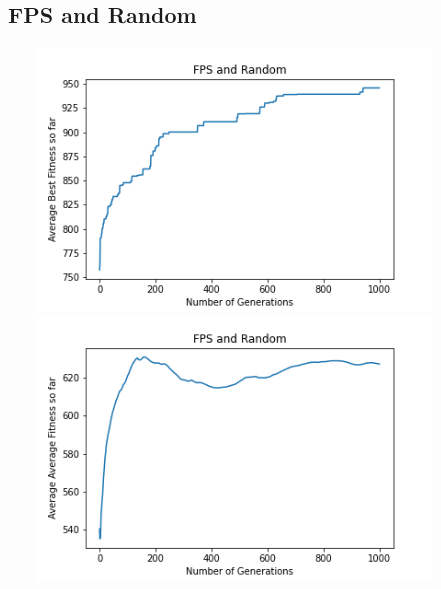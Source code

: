 \documentclass[a4paper]{article}
\begin{document}
\subsection{FPS and Random}
\includegraphics[width=12cm, height=7cm]{Graphs/KnapSack/fps_rand_bsf.png} \\
\includegraphics[width=12cm, height=7cm]{Graphs/KnapSack/fps_rand_avg.png} \\
\end{document}
